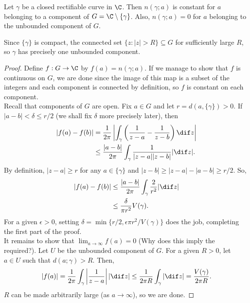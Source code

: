 		\begin{ftheo}
			\label{theo: winding number constant on components}
			Let $\gamma$ be a closed rectifiable curve in $\C$. Then $n(\gamma;a)$ is constant for $a$ belonging to a component of $G = \C \setminus \{\gamma\}$. Also, $n(\gamma;a) = 0$ for $a$ belonging to the unbounded component of $G$.
		\end{ftheo}
		\begin{remark}
			Since $\{\gamma\}$ is compact, the connected set $\{ z : |z| > R \} \subseteq G$ for sufficiently large $R$, so $\gamma$ has precisely one unbounded component.
		\end{remark}
		\begin{proof}
			Define $f : G \to \C$ by $f(a) = n(\gamma;a)$.
			If we manage to show that $f$ is continuous on $G$, we are done since the image of this map is a subset of the integers and each component is connected by definition, so $f$ is constant on each component.\\
			Recall that components of $G$ are open. Fix $a \in G$ and let $r = d(a , \{\gamma\}) > 0$. If $|a-b| < \delta \le r/2$ (we shall fix $\delta$ more precisely later), then
			\begin{align*}
				|f(a) - f(b)| &= \frac{1}{2\pi} \left| \int_\gamma \left( \frac{1}{z-a} - \frac{1}{z-b} \right) \dif z \right| \\
					&\le \frac{|a-b|}{2\pi} \int_\gamma \frac{1}{|z-a||z-b|} |{\dif} {z}|.
			\end{align*}
			By definition, $|z-a| \ge r$ for any $a \in \{\gamma\}$ and $|z-b| \ge |z-a| - |a-b| \ge r/2$. So,
			\begin{align*}
				|f(a) - f(b)| &\le \frac{|a-b|}{2\pi} \int_\gamma \frac{2}{r^2} |{\dif} {z}| \\
					&\le \frac{\delta}{\pi r^2} V(\gamma).
			\end{align*}
			For a given $\epsilon > 0$, setting $\delta = \min\{r/2, \epsilon\pi r^2 / V(\gamma)\}$ does the job, completing the first part of the proof.\\

			It remains to show that $\lim_{a\to\infty}f(a) = 0$ (Why does this imply the required?). Let $U$ be the unbounded component of $G$. For a given $R > 0$, let $a \in U$ such that $d(a;\gamma) > R$. Then,
			\[ |f(a)| = \frac{1}{2\pi} \int_\gamma \left|\frac{1}{z-a}\right| |{\dif} {z}| \le \frac{1}{2\pi R} \int_\gamma |{\dif} {z}| = \frac{V(\gamma)}{2\pi R}. \]
			$R$ can be made arbitrarily large (as $a\to\infty$), so we are done.
		\end{proof}

